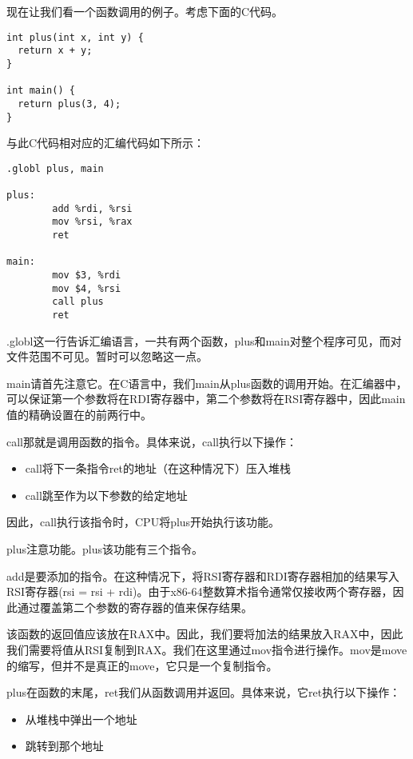 \documentclass[cn,10pt,math=newtx,citestyle=gb7714-2015,bibstyle=gb7714-2015]{elegantbook}
\begin{document}
现在让我们看一个函数调用的例子。考虑下面的C代码。

\begin{verbatim}
int plus(int x, int y) {
  return x + y;
}

int main() {
  return plus(3, 4);
}
\end{verbatim}

与此C代码相对应的汇编代码如下所示：

\begin{verbatim}
.globl plus, main

plus:
        add %rdi, %rsi
        mov %rsi, %rax
        ret

main:
        mov $3, %rdi
        mov $4, %rsi
        call plus
        ret
\end{verbatim}

.globl这一行告诉汇编语言，一共有两个函数，plus和main对整个程序可见，而对文件范围不可见。暂时可以忽略这一点。

main请首先注意它。在C语言中，我们main从plus函数的调用开始。在汇编器中，可以保证第一个参数将在RDI寄存器中，第二个参数将在RSI寄存器中，因此main值的精确设置在的前两行中。

call那就是调用函数的指令。具体来说，call执行以下操作：

\begin{itemize}
    \item call将下一条指令ret的地址（在这种情况下）压入堆栈
    \item call跳至作为以下参数的给定地址
\end{itemize}

因此，call执行该指令时，CPU将plus开始执行该功能。

plus注意功能。plus该功能有三个指令。

add是要添加的指令。在这种情况下，将RSI寄存器和RDI寄存器相加的结果写入RSI寄存器(rsi = rsi + rdi)。由于x86-64整数算术指令通常仅接收两个寄存器，因此通过覆盖第二个参数的寄存器的值来保存结果。

该函数的返回值应该放在RAX中。因此，我们要将加法的结果放入RAX中，因此我们需要将值从RSI复制到RAX。我们在这里通过mov指令进行操作。mov是move的缩写，但并不是真正的move，它只是一个复制指令。

plus在函数的末尾，ret我们从函数调用并返回。具体来说，它ret执行以下操作：

\begin{itemize}
    \item 从堆栈中弹出一个地址
    \item 跳转到那个地址
\end{itemize}
\end{document}
